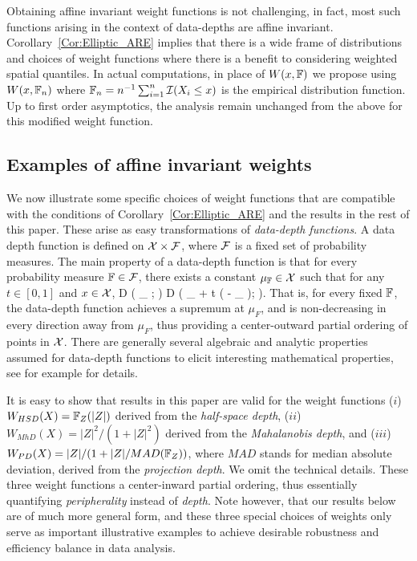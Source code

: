 Obtaining affine invariant weight functions is not challenging, in fact, most 
such functions arising in the context of data-depths are affine invariant. 
Corollary~\ref{Cor:Elliptic_ARE} implies that there is a wide frame of distributions and 
choices of weight functions where there is a benefit to considering weighted spatial 
quantiles. In actual computations, in place of $W (x, {\mathbb{F}})$ we propose 
using $W (x, {\mathbb{F}}_{n})$ where 
${\mathbb{F}}_{n} = n^{-1} \sum_{i = 1}^{n} \mathcal{I} (X_{i} \leq x )$ is the empirical distribution 
function. Up to first order asymptotics, the analysis remain unchanged from the above 
for this modified weight function.

\subsection{Examples of affine invariant weights}

We now illustrate some specific choices of weight functions that are compatible with the 
conditions of Corollary~\ref{Cor:Elliptic_ARE} and the results in the rest of this paper.
 These arise as easy transformations 
of \textit{data-depth functions}. A data depth function 
is defined on $\mathcal{X} \times \mathcal{F}$, where $\mathcal{F}$ is  a fixed set of probability measures.
The main property of a data-depth function is that for every probability measure 
${\mathbb{F}} \in \mathcal{F}$, there exists a constant 
$\mu_{{\mathbb{F}}} \in  \mathcal{X}$ such that for any $t \in [ 0, 1]$ and $x \in \mathcal{X}$,
\baq 
D ( \mu_{\BF} ; \BF ) \geq D ( \mu_{\BF} + t ( \bfx - \mu_{\BF} ); \BF ). 
\label{eq:Peripherality}
\eaq
That is, for every fixed ${\mathbb{F}}$, the data-depth function achieves a supremum at 
$\mu_{F}$, and is non-decreasing in every direction away from $\mu_{F}$, thus providing 
a  center-outward partial ordering of points in $\mathcal{X}$. There are generally several 
algebraic and analytic properties assumed for data-depth functions to elicit interesting 
mathematical properties, see for example 
\cite{ref:AoS00461_ZuoSerfling, ref:DIMACS061_Serfling} 
for details.

It is easy to show that results in this paper are valid for the weight functions
($i$) $W_{HSD} (X) = {\mathbb{F}}_{Z} (| Z |)$ derived from the \textit{half-space depth},  
($ii$) $W_{MhD} (X) = |Z|^{2}/(1 + | Z |^2)$ derived from the \textit{Mahalanobis depth}, 
and  
($iii$) $W_{PD} (X) = |Z|/(1+ | Z |/MAD({\mathbb{F}}_{Z}))$, where $MAD$ stands for median 
absolute deviation, derived from the \textit{projection depth}. We omit the technical 
details. These three weight functions a center-inward partial ordering, thus essentially 
quantifying \textit{peripherality} instead of \textit{depth}.
Note however, that our results below are of much more general form, and 
these three special choices of weights only serve as important illustrative examples 
to achieve desirable robustness and efficiency balance in data analysis.


